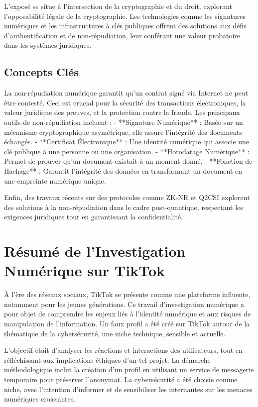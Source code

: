 \documentclass[12pt,a4paper]{article}
\begin{document}
L'exposé se situe à l'intersection de la cryptographie et du droit, explorant l'opposabilité légale de la cryptographie. Les technologies comme les signatures numériques et les infrastructures à clés publiques offrent des solutions aux défis d'authentification et de non-répudiation, leur conférant une valeur probatoire dans les systèmes juridiques.

\subsection{Concepts Clés}

La non-répudiation numérique garantit qu'un contrat signé via Internet ne peut être contesté. Ceci est crucial pour la sécurité des transactions électroniques, la valeur juridique des preuves, et la protection contre la fraude. Les principaux outils de non-répudiation incluent :
- **Signature Numérique** : Basée sur un mécanisme cryptographique asymétrique, elle assure l'intégrité des documents échangés.
- **Certificat Électronique** : Une identité numérique qui associe une clé publique à une personne ou une organisation.
- **Horodatage Numérique** : Permet de prouver qu'un document existait à un moment donné.
- **Fonction de Hachage** : Garantit l’intégrité des données en transformant un document en une empreinte numérique unique.

Enfin, des travaux récents sur des protocoles comme ZK-NR et Q2CSI explorent des solutions à la non-répudiation dans le cadre post-quantique, respectant les exigences juridiques tout en garantissant la confidentialité.

\section{Résumé de l'Investigation Numérique sur TikTok}

À l’ère des réseaux sociaux, TikTok se présente comme une plateforme influente, notamment pour les jeunes générations. Ce travail d’investigation numérique a pour objet de comprendre les enjeux liés à l’identité numérique et aux risques de manipulation de l’information. Un faux profil a été créé sur TikTok autour de la thématique de la cybersécurité, une niche technique, sensible et actuelle.

L’objectif était d’analyser les réactions et interactions des utilisateurs, tout en réfléchissant aux implications éthiques d’un tel projet. La démarche méthodologique inclut la création d’un profil en utilisant un service de messagerie temporaire pour préserver l’anonymat. La cybersécurité a été choisie comme niche, avec l'intention d'informer et de sensibiliser les internautes sur les menaces numériques croissantes.
\end{document}
